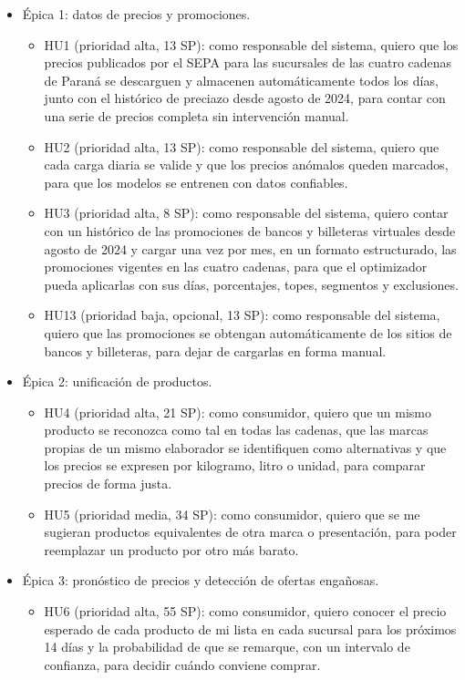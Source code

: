 \documentclass[
11pt, %
]{charter}
\begin{document}
\begin{itemize}
	\item Épica 1: datos de precios y promociones.
	\begin{itemize}
		\item HU1 (prioridad alta, 13 SP): como responsable del sistema, quiero que los precios publicados por el SEPA para las sucursales de las cuatro cadenas de Paraná se descarguen y almacenen automáticamente todos los días, junto con el histórico de preciazo desde agosto de 2024, para contar con una serie de precios completa sin intervención manual.
		\item HU2 (prioridad alta, 13 SP): como responsable del sistema, quiero que cada carga diaria se valide y que los precios anómalos queden marcados, para que los modelos se entrenen con datos confiables.
		\item HU3 (prioridad alta, 8 SP): como responsable del sistema, quiero contar con un histórico de las promociones de bancos y billeteras virtuales desde agosto de 2024 y cargar una vez por mes, en un formato estructurado, las promociones vigentes en las cuatro cadenas, para que el optimizador pueda aplicarlas con sus días, porcentajes, topes, segmentos y exclusiones.
		\item HU13 (prioridad baja, opcional, 13 SP): como responsable del sistema, quiero que las promociones se obtengan automáticamente de los sitios de bancos y billeteras, para dejar de cargarlas en forma manual.
	\end{itemize}
	\item Épica 2: unificación de productos.
	\begin{itemize}
		\item HU4 (prioridad alta, 21 SP): como consumidor, quiero que un mismo producto se reconozca como tal en todas las cadenas, que las marcas propias de un mismo elaborador se identifiquen como alternativas y que los precios se expresen por kilogramo, litro o unidad, para comparar precios de forma justa.
		\item HU5 (prioridad media, 34 SP): como consumidor, quiero que se me sugieran productos equivalentes de otra marca o presentación, para poder reemplazar un producto por otro más barato.
	\end{itemize}
	\item Épica 3: pronóstico de precios y detección de ofertas engañosas.
	\begin{itemize}
		\item HU6 (prioridad alta, 55 SP): como consumidor, quiero conocer el precio esperado de cada producto de mi lista en cada sucursal para los próximos 14 días y la probabilidad de que se remarque, con un intervalo de confianza, para decidir cuándo conviene comprar.

\end{itemize}
\end{itemize}
\end{document}
